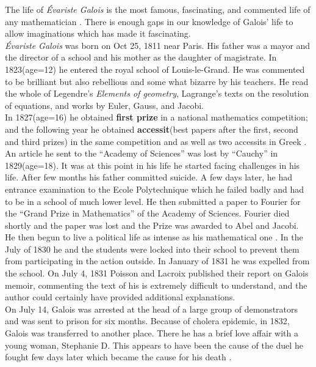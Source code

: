 The life of \textit{Évariste Galois} is the most famous, fascinating, and commented life of any mathematician \cite{galois}. There is enough gaps in our knowledge of Galois' life to allow imaginations which has made it fascinating.\\

\textit{Évariste Galois} was born on Oct 25, 1811 near Paris. His father was a mayor and the director of a school and his mother as the daughter of magistrate. In 1823(age=12) he entered the royal school of Louis-le-Grand. He was commented to be brilliant but also rebellious and some what bizarre by his teachers. He read the whole of Legendre's \textit{Elements of geometry},  Lagrange's texts on the resolution of equations, and works by Euler, Gauss, and Jacobi.\\
In 1827(age=16) he obtained \textbf{first prize} in a national mathematics competition; and the following year he obtained \textbf{accessit}(best papers after the first, second and third prizes) in the same competition and as well as two accessits  in Greek \cite{galois}.\\

An article he sent to the ``Academy of Sciences'' was lost by ``Cauchy'' in 1829(age=18). It was at this point in his life he started facing challenges in his life. After few months his father committed suicide. A few days later, he had entrance examination to the Ecole Polytechnique which he failed badly and had to be in a school of much lower level. He then submitted a paper to Fourier for the ``Grand Prize in Mathematics'' of the Academy of Sciences. Fourier died shortly and the paper was lost and the Prize was awarded to Abel and Jacobi.\\

He then begun to live a political life as intense as his mathematical one \cite{galois}. In the July of 1830 he and the students were locked into their school to prevent them from participating in the action outside. In January of 1831 he was expelled from the school. On July 4, 1831 Poisson and Lacroix published their report on Galois memoir, commenting the text of his is extremely difficult to understand, and the author could certainly have provided additional explanations.\\

On July 14, Galois was arrested at the head of a large group of demonstrators and was sent to prison for six months. Because of cholera epidemic, in 1832, Galois was transferred to another place. There he has a brief love affair with a young woman, Stephanie D. This appears to have been the cause of the duel he fought few days later which became the cause for his death \cite{galois}.
